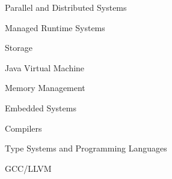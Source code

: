 
\begin{minipage}[t]{.33\linewidth}
  \begin{cvitems}
    \item Parallel and Distributed Systems
    \item Managed Runtime Systems
    \item Storage
  \end{cvitems}
\end{minipage}%
%
\hspace{20pt}
%
\begin{minipage}[t]{.33\linewidth}
  \begin{cvitems}
    \item Java Virtual Machine
    \item Memory Management
    \item Embedded Systems
  \end{cvitems}
\end{minipage}%
%
\hspace{20pt}
%
\begin{minipage}[t]{.33\linewidth}
  \begin{cvitems}
    \item Compilers
    \item Type Systems and
	 Programming Languages
    \item GCC/LLVM
  \end{cvitems}
\end{minipage}%
%

\vspace{15pt}
